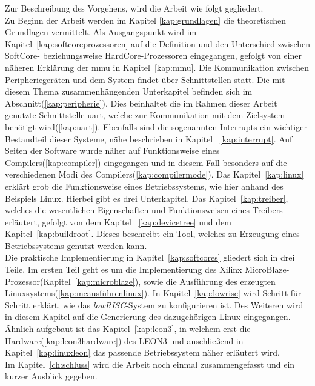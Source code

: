 Zur Beschreibung des Vorgehens, wird die Arbeit wie folgt gegliedert.\\
 Zu Beginn der Arbeit werden im Kapitel \ref{kap:grundlagen} die theoretischen Grundlagen vermittelt. Als
Ausgangspunkt wird im Kapitel~\ref{kap:softcoreprozessoren} auf die Definition und den Unterschied zwischen SoftCore- beziehungsweise HardCore-Prozessoren eingegangen,
gefolgt von einer näheren Erklärung der \ac{mmu} in Kapitel~\ref{kap:mmu}. Die Kommunikation zwischen
Peripheriegeräten und dem System findet über Schnittstellen statt. Die mit diesem Thema zusammenhängenden
Unterkapitel befinden sich im Abschnitt(\ref{kap:peripherie}).
Dies beinhaltet die im Rahmen dieser Arbeit genutzte Schnittstelle \ac{uart}, welche zur Kommunikation mit dem
Zielsystem benötigt wird(\ref{kap:uart}). Ebenfalls sind die sogenannten Interrupts ein wichtiger
Bestandteil dieser Systeme, nähe beschrieben in Kapitel ~\ref{kap:interrupt}.
Auf Seiten der Software wurde näher auf Funktionsweise eines Compilers(\ref{kap:compiler}) eingegangen und in diesem Fall
besonders auf die verschiedenen Modi des Compilers(\ref{kap:compilermode}).
Das Kapitel~\ref{kap:linux} erklärt grob die
Funktionsweise eines Betriebssystems, wie hier anhand des Beispiels Linux. Hierbei gibt es drei Unterkapitel.
Das Kapitel~\ref{kap:treiber}, welches die wesentlichen Eigenschaften und Funktionsweisen
eines Treibers erläutert, gefolgt von dem Kapitel ~\ref{kap:devicetree} und dem Kapitel~\ref{kap:buildroot}.
Dieses beschreibt ein Tool, welches zu Erzeugung
eines Betriebssystems genutzt werden kann.\\
Die praktische Implementierung in Kapitel~\ref{kap:softcores} gliedert sich in drei Teile.
Im ersten Teil geht es um die Implementierung des Xilinx MicroBlaze-Prozessor(Kapitel~\ref{kap:microblaze}),
sowie die Ausführung des erzeugten Linuxsystems(\ref{kap:mcausführenlinux}).
In Kapitel~\ref{kap:lowrisc} wird Schritt für Schritt erklärt, wie das \emph{lowRISC}-System zu konfigurieren ist. Des Weiteren wird
in diesem Kapitel auf die Generierung des dazugehörigen Linux eingegangen. Ähnlich aufgebaut ist das Kapitel~\ref{kap:leon3}, in welchem
erst die Hardware(\ref{kap:leon3hardware}) des LEON3 und anschließend in Kapitel~\ref{kap:linuxleon} das passende Betriebssystem näher erläutert wird.\\
Im Kapitel~\ref{ch:schluss} wird die Arbeit noch einmal zusammengefasst und ein kurzer Ausblick gegeben.\\
